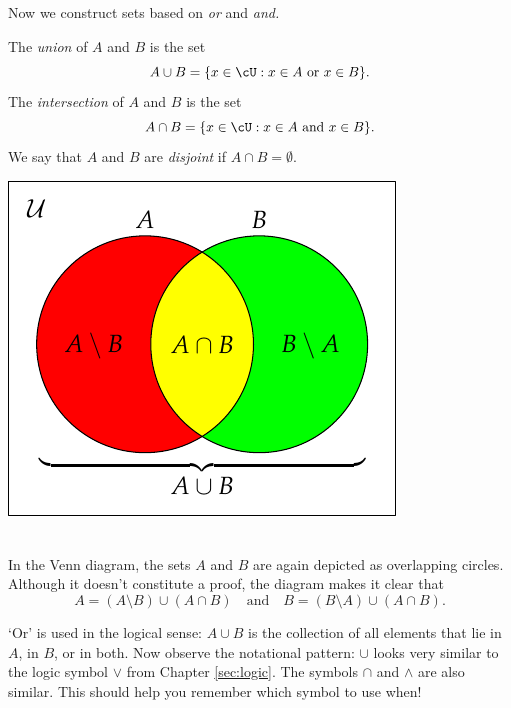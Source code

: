\noindent\begin{minipage}{0.62\textwidth}
Now we construct sets based on \emph{or} and \emph{and.}

\begin{defn}\label{defn:unionint}
The \emph{union} of $A$ and $B$ is the set
\[A\cup B=\{x\in\cU:x\in A\text{ or }x\in B\}.\]
The \emph{intersection} of $A$ and $B$ is the set
\[A\cap B=\{x\in\cU:x\in A\text{ and }x\in B\}.\]
We say that $A$ and $B$ are \emph{disjoint} if $A\cap B=\emptyset$.
\end{defn}
\end{minipage}\qquad
\begin{minipage}{0.33\textwidth}
\includegraphics[width=\textwidth]{sets-04-vennunion}
\end{minipage}\\

\noindent In the Venn diagram, the sets $A$ and $B$ are again depicted as overlapping circles. Although it doesn't constitute a proof, the diagram makes it clear that
\[A=(A\setminus B)\cup (A\cap B)\quad\text{and}\quad B=(B\setminus A)\cup(A\cap B).\]

`Or' is used in the logical sense: $A\cup B$ is the collection of all elements that lie in $A$, in $B$, or in both.
Now observe the notational pattern: $\cup$ looks very similar to the logic symbol $\vee$ from Chapter \ref{sec:logic}. The symbols $\cap$ and $\wedge$ are also similar. This should help you remember which symbol to use when!

